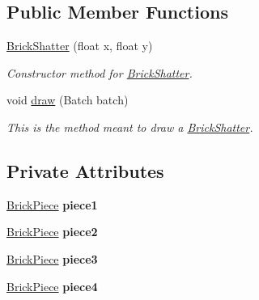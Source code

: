 \subsection*{Public Member Functions}
\begin{DoxyCompactItemize}
\item 
\hyperlink{classnl_1_1arjanfrans_1_1mario_1_1model_1_1brick_1_1BrickShatter_a5ea2c39e2ee5b639935f1a3102f2e4a9}{Brick\+Shatter} (float x, float y)
\begin{DoxyCompactList}\small\item\em Constructor method for \hyperlink{classnl_1_1arjanfrans_1_1mario_1_1model_1_1brick_1_1BrickShatter}{Brick\+Shatter}. \end{DoxyCompactList}\item 
void \hyperlink{classnl_1_1arjanfrans_1_1mario_1_1model_1_1brick_1_1BrickShatter_a905743105e75d0c38df647508d51ffa8}{draw} (Batch batch)
\begin{DoxyCompactList}\small\item\em This is the method meant to draw a \hyperlink{classnl_1_1arjanfrans_1_1mario_1_1model_1_1brick_1_1BrickShatter}{Brick\+Shatter}. \end{DoxyCompactList}\end{DoxyCompactItemize}
\subsection*{Private Attributes}
\begin{DoxyCompactItemize}
\item 
\mbox{\label{classnl_1_1arjanfrans_1_1mario_1_1model_1_1brick_1_1BrickShatter_ad2e96eaadb09408cda11ad7fd99dd1bb}} 
\hyperlink{classnl_1_1arjanfrans_1_1mario_1_1model_1_1brick_1_1BrickPiece}{Brick\+Piece} {\bfseries piece1}
\item 
\mbox{\label{classnl_1_1arjanfrans_1_1mario_1_1model_1_1brick_1_1BrickShatter_aade6a079b36b6d0891b7ad80a248551c}} 
\hyperlink{classnl_1_1arjanfrans_1_1mario_1_1model_1_1brick_1_1BrickPiece}{Brick\+Piece} {\bfseries piece2}
\item 
\mbox{\label{classnl_1_1arjanfrans_1_1mario_1_1model_1_1brick_1_1BrickShatter_a554359af225e73feb086b62a4daf1a00}} 
\hyperlink{classnl_1_1arjanfrans_1_1mario_1_1model_1_1brick_1_1BrickPiece}{Brick\+Piece} {\bfseries piece3}
\item 
\mbox{\label{classnl_1_1arjanfrans_1_1mario_1_1model_1_1brick_1_1BrickShatter_a9fc97e4bf031b32e1a941336e0bcd50e}} 
\hyperlink{classnl_1_1arjanfrans_1_1mario_1_1model_1_1brick_1_1BrickPiece}{Brick\+Piece} {\bfseries piece4}
\end{DoxyCompactItemize}


